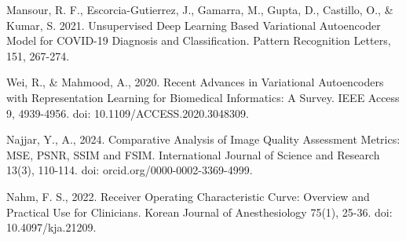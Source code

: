 \begin{thebibliography}{9}
  Mansour, R. F., Escorcia-Gutierrez, J., Gamarra, M., Gupta, D.,
  Castillo, O., \& Kumar, S. 2021. Unsupervised Deep Learning Based
  Variational Autoencoder Model for COVID-19 Diagnosis and
  Classification. Pattern Recognition Letters, 151, 267-274.

  Wei, R., \& Mahmood, A., 2020. Recent Advances in Variational
  Autoencoders with Representation Learning for Biomedical
  Informatics: A Survey. IEEE Access 9, 4939-4956. doi:
  10.1109/ACCESS.2020.3048309.

  Najjar, Y., A., 2024. Comparative Analysis of Image Quality
  Assessment Metrics: MSE, PSNR, SSIM and FSIM. International Journal
  of Science and Research 13(3), 110-114. doi: orcid.org/0000-0002-3369-4999.

  Nahm, F. S., 2022. Receiver Operating Characteristic Curve:
  Overview and Practical Use for Clinicians. Korean Journal of
  Anesthesiology 75(1), 25-36. doi: 10.4097/kja.21209.

\end{thebibliography}
